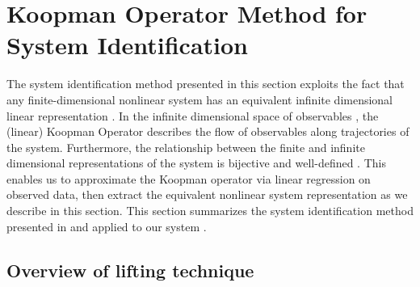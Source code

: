 \section{Koopman Operator Method for \\ System Identification}
\label{sec:theory}

The system identification method presented in this section exploits the fact that any finite-dimensional nonlinear system has an equivalent infinite dimensional linear representation .
In the infinite dimensional space of observables , the (linear) Koopman Operator describes the flow of observables along trajectories of the system.
Furthermore, the relationship between the finite and infinite dimensional representations of the system is bijective and  well-defined .
This enables us to approximate the Koopman operator via linear regression on observed data, then extract the equivalent nonlinear system representation as we describe in this section.
This section summarizes the system identification method presented in \cite{mauroy2016linear} and \cite{mauroy2017koopman} applied to our system .


\subsection{Overview of lifting technique}


